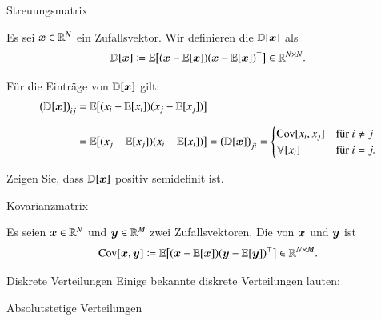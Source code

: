 \begin{frame}{Streuungsmatrix}{}
	\begin{mydef}
		Es sei $\bm{x} \in \mathbb{R}^N$ ein Zufallsvektor. Wir definieren die  $\mathbb{D}[\bm{x}]$ als
		\begin{equation*}
			\mathbb{D}[\bm{x}] \coloneqq \mathbb{E}\bigl[ (\bm{x} - \mathbb{E}[\bm{x}]) (\bm{x} - \mathbb{E}[\bm{x}])^\top \bigr] \in \mathbb{R}^{N \times N}.
		\end{equation*}
	\end{mydef}

	Für die Einträge von $\mathbb{D}[\bm{x}]$ gilt:
	\begin{align*}
		\bigl( \mathbb{D}[\bm{x}] \bigr)_{ij}
			&= \mathbb{E}\bigl[ (x_i - \mathbb{E}[x_i]) (x_j - \mathbb{E}[x_j]) \bigr]
	\\[2mm]
			&= \mathbb{E}\bigl[ (x_j - \mathbb{E}[x_j]) (x_i - \mathbb{E}[x_i]) \bigr]
			= \bigl( \mathbb{D}[\bm{x}] \bigr)_{ji} =
			\begin{cases}
				\text{Cov}[x_i, x_j] & \text{für}\ i \ne j \\
				\mathbb{V}[x_i] & \text{für}\ i = j.
			\end{cases}
	\end{align*}

	\begin{mytask}
		Zeigen Sie, dass $\mathbb{D}[\bm{x}]$ positiv semidefinit ist.
	\end{mytask}
\end{frame}


\begin{frame}{Kovarianzmatrix}{}
	\begin{mydef}
		Es seien $\bm{x} \in \mathbb{R}^N$ und $\bm{y} \in \mathbb{R}^M$ zwei Zufallsvektoren. Die  von $\bm{x}$ und $\bm{y}$ ist
		\begin{equation*}
			\text{Cov}[\bm{x}, \bm{y}] \coloneqq \mathbb{E}\bigl[ (\bm{x} - \mathbb{E}[\bm{x}]) (\bm{y} - \mathbb{E}[\bm{y}])^\top \bigr] \in \mathbb{R}^{N \times M}.
		\end{equation*} 
	\end{mydef}
\end{frame}


\begin{frame}{Diskrete Verteilungen}{}
	Einige bekannte diskrete Verteilungen lauten:
	
\end{frame}


\begin{frame}{Absolutstetige Verteilungen}{}
	
\end{frame}


